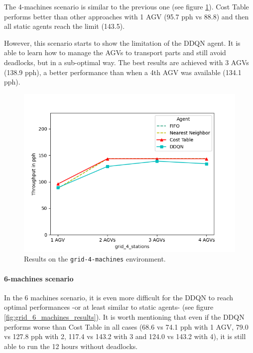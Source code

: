 \documentclass[sn-mathphys]{sn-jnl}
\begin{document}
The 4-machines scenario is similar to the previous one (see figure \ref{fig:grid_4_machines_results}). Cost Table performs better than other approaches with 1 AGV (95.7 pph vs 88.8) and then all static agents reach the limit (143.5). 

However, this scenario starts to show the limitation of the DDQN agent. It is able to learn how to manage the AGVs to transport parts and still avoid deadlocks, but in a sub-optimal way. The best results are achieved with 3 AGVs (138.9 pph), a better performance than when a 4th AGV was available (134.1 pph).

\begin{figure}[ht]
  \includegraphics[width=1.0\textwidth]{results_grid_4_machines.png}
  \caption{Results on the \texttt{grid-4-machines} environment.}
  \label{fig:grid_4_machines_results}
\end{figure}

\paragraph{6-machines scenario}

In the 6 machines scenario, it is even more difficult for the DDQN to reach optimal performances -or at least similar to static agents- (see figure \ref{fig:grid_6_machines_results}). It is worth mentioning that even if the DDQN performs worse than Cost Table in all cases (68.6 vs 74.1 pph with 1 AGV, 79.0 vs 127.8 pph with 2, 117.4 vs 143.2 with 3 and 124.0 vs 143.2 with 4), it is still able to run the 12 hours without deadlocks.
\end{document}
